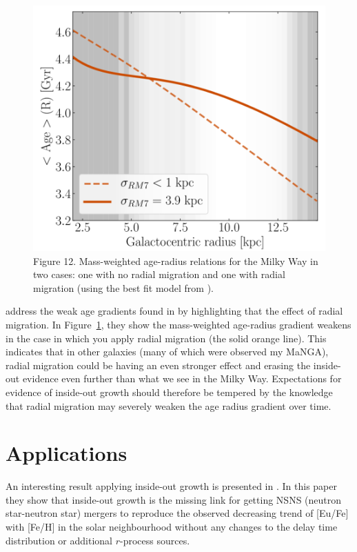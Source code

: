\documentclass[preprint2]{aastex631}
\begin{document}
\begin{figure}[tb]
    \centering
    \includegraphics[width=\columnwidth]{frankel2019_fig12.png}
    \caption{\citet{Frankel+2019} Figure 12. Mass-weighted age-radius relations for the Milky Way in two cases: one with no radial migration and one with radial migration (using the best fit model from \citet{Frankel+2019}).}
    \label{fig:frankel_gradient}
\end{figure}

\citet{Frankel+2019} address the weak age gradients found in \citet{Goddard+2017} by highlighting that the effect of radial migration. In Figure~\ref{fig:frankel_gradient}, they show the mass-weighted age-radius gradient weakens in the case in which you apply radial migration (the solid orange line). This indicates that in other galaxies (many of which were observed my MaNGA), radial migration could be having an even stronger effect and erasing the inside-out evidence even further than what we see in the Milky Way. Expectations for evidence of inside-out growth should therefore be tempered by the knowledge that radial migration may severely weaken the age radius gradient over time.

\section{Applications}
An interesting result applying inside-out growth is presented in \citet{Banerjee+2020}. In this paper they show that inside-out growth is the missing link for getting NSNS (neutron star-neutron star) mergers to reproduce the observed decreasing trend of [Eu/Fe] with [Fe/H] in the solar neighbourhood without any changes to the delay time distribution or additional $r$-process sources.
\end{document}
